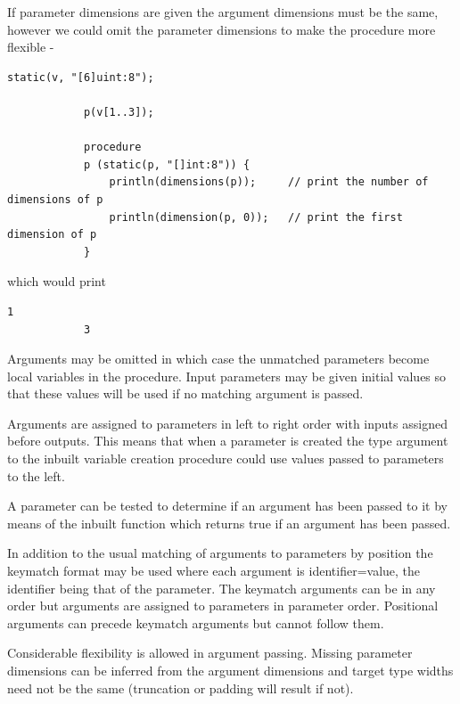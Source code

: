        If parameter dimensions are given the argument dimensions must be the same,
        however we could omit the parameter dimensions to make the procedure more
        flexible -
        \begin{lstlisting}[language=threepl]
            static(v, "[6]uint:8");

            p(v[1..3]);

            procedure
            p (static(p, "[]int:8")) {
                println(dimensions(p));     // print the number of dimensions of p
                println(dimension(p, 0));   // print the first dimension of p
            }
        \end{lstlisting}
        which would print
        \begin{lstlisting}[language=threepl]
            1
            3
        \end{lstlisting}

        Arguments may be omitted in which case the unmatched parameters become
        local variables in the procedure. Input parameters may be given initial values
        so that these values will be used if no matching argument is passed.

        Arguments are assigned to parameters in left to right order with inputs
        assigned before outputs. This means that when a parameter is created
        the type argument to the inbuilt variable creation procedure could use
        values passed to parameters to the left.

        A parameter can be tested to determine if an argument has been passed to it by
        means of the inbuilt function  which returns true if an argument
        has been passed.

        In addition to the usual matching of arguments to parameters by position
        the keymatch format may be used where each argument is identifier=value,
        the identifier being that of the parameter. The keymatch arguments can be
        in any order but arguments are assigned to parameters in parameter order.
        Positional arguments can precede keymatch arguments but cannot follow them.

        Considerable flexibility is allowed in argument passing. Missing parameter
        dimensions can be inferred from the argument dimensions and target type widths
        need not be the same (truncation or padding will result if not).

